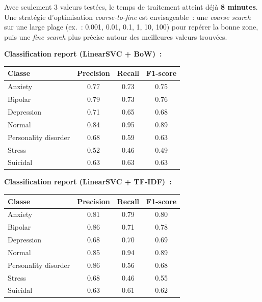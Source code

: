 \documentclass[12pt,a4paper]{report}
\begin{document}
\begin{warn}[Attention]
Avec seulement 3 valeurs testées, le temps de traitement atteint déjà \textbf{8 minutes}. Une stratégie d'optimisation \textit{coarse-to-fine} est envisageable~: une \textit{coarse search} sur une large plage (ex.~: 0.001, 0.01, 0.1, 1, 10, 100) pour repérer la bonne zone, puis une \textit{fine search} plus précise autour des meilleures valeurs trouvées.
\end{warn}

\textbf{Classification report (LinearSVC + BoW)~:}

\begin{center}
\begin{tabular}{lccc}
\toprule
\textbf{Classe} & \textbf{Precision} & \textbf{Recall} & \textbf{F1-score} \\
\midrule
Anxiety              & 0.77 & 0.73 & 0.75 \\
Bipolar              & 0.79 & 0.73 & 0.76 \\
Depression           & 0.71 & 0.65 & 0.68 \\
Normal               & 0.84 & 0.95 & 0.89 \\
Personality disorder & 0.68 & 0.59 & 0.63 \\
Stress               & 0.52 & 0.46 & 0.49 \\
Suicidal             & 0.63 & 0.63 & 0.63 \\
\bottomrule
\end{tabular}
\end{center}

\textbf{Classification report (LinearSVC + TF-IDF)~:}

\begin{center}
\begin{tabular}{lccc}
\toprule
\textbf{Classe} & \textbf{Precision} & \textbf{Recall} & \textbf{F1-score} \\
\midrule
Anxiety              & 0.81 & 0.79 & 0.80 \\
Bipolar              & 0.86 & 0.71 & 0.78 \\
Depression           & 0.68 & 0.70 & 0.69 \\
Normal               & 0.85 & 0.94 & 0.89 \\
Personality disorder & 0.86 & 0.56 & 0.68 \\
Stress               & 0.68 & 0.46 & 0.55 \\
Suicidal             & 0.63 & 0.61 & 0.62 \\
\bottomrule
\end{tabular}
\end{center}
\end{document}
